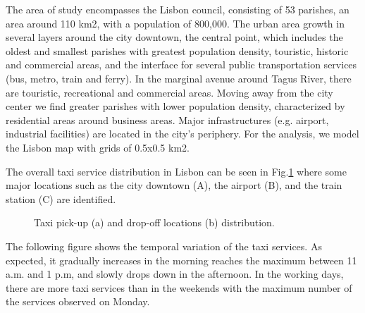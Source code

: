 \documentclass[a4paper, 10pt, conference]{ieeeconf}      %
\begin{document}
The area of study encompasses the Lisbon council, consisting of 53 parishes, an area around 110 km2, with a population of 800,000. The urban area growth in several layers around the city downtown, the central point, which includes the oldest and smallest parishes with greatest population density, touristic, historic and commercial areas, and the interface for several public transportation services (bus, metro, train and ferry).  In the marginal avenue around Tagus River, there are touristic, recreational and commercial areas. Moving away from the city center we find greater parishes with lower population density, characterized by residential areas around business areas. Major infrastructures (e.g. airport, industrial facilities) are located in the city’s periphery. For the analysis, we model the Lisbon map with grids of 0.5x0.5 km2. 

The overall taxi service distribution in Lisbon can be seen in Fig.\ref{fig:my_png_1} where some major locations such as the city downtown (A), the airport (B), and the train station (C) are identified.  

\begin{figure}[htbp]
    \centering

    \caption{ Taxi pick-up (a) and drop-off locations (b) distribution. }
    \label{fig:my_png_1}
\end{figure}

The following figure shows the temporal variation of the taxi services. As expected, it gradually increases in the morning reaches the maximum between 11 a.m. and 1 p.m, and slowly drops down in the afternoon. In the working days, there are more taxi services than in the weekends with the maximum number of the services observed on Monday. 
\end{document}
